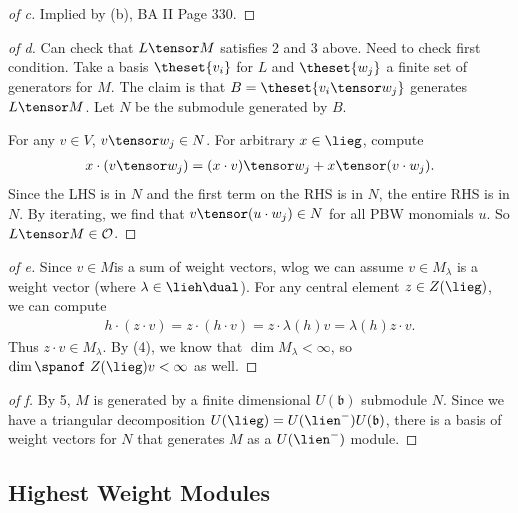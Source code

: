 \begin{proof}[of c]

Implied by (b), BA II Page 330.

\end{proof}

\begin{proof}[of d]

Can check that \(L\tensor M\) satisfies 2 and 3 above. Need to check
first condition. Take a basis \(\theset{v_i}\) for \(L\) and
\(\theset{w_j}\) a finite set of generators for \(M\). The claim is that
\(B = \theset{v_i \tensor w_j}\) generates \(L\tensor M\). Let \(N\) be
the submodule generated by \(B\).

For any \(v\in V\), \(v\tensor w_j \in N\). For arbitrary
\(x\in \lieg\), compute
\begin{align*}x\cdot(v\tensor w_j) = (x\cdot v) \tensor w_j + x\tensor (v\cdot w_j).\end{align*}
Since the LHS is in \(N\) and the first term on the RHS is in \(N\), the
entire RHS is in \(N\). By iterating, we find that
\(v\tensor (u\cdot w_j) \in N\) for all PBW monomials \(u\). So
\(L\tensor M \in \mathcal O\).

\end{proof}

\begin{proof}[of e]

Since \(v\in M\)is a sum of weight vectors, wlog we can assume
\(v \in M_\lambda\) is a weight vector (where
\(\lambda \in \lieh\dual\)). For any central element \(z\in Z(\lieg)\),
we can compute
\begin{align*}h\cdot(z\cdot v) = z \cdot (h\cdot v) = z \cdot \lambda(h) v = \lambda(h)z \cdot v.\end{align*}
Thus \(z\cdot v\in M_\lambda\). By (4), we know that
\(\dim M_\lambda < \infty\), so \(\dim \spanof ~Z(\lieg) v < \infty\) as
well.

\end{proof}

\begin{proof}[of f]

By 5, \(M\) is generated by a finite dimensional \(U(\mathfrak b)\)
submodule \(N\). Since we have a triangular decomposition
\(U(\lieg) = U(\lien^-) U(\mathfrak b)\), there is a basis of weight
vectors for \(N\) that generates \(M\) as a \(U(\lien^-)\) module.

\end{proof}

\hypertarget{highest-weight-modules}{%
\subsection{Highest Weight Modules}\label{highest-weight-modules}}

